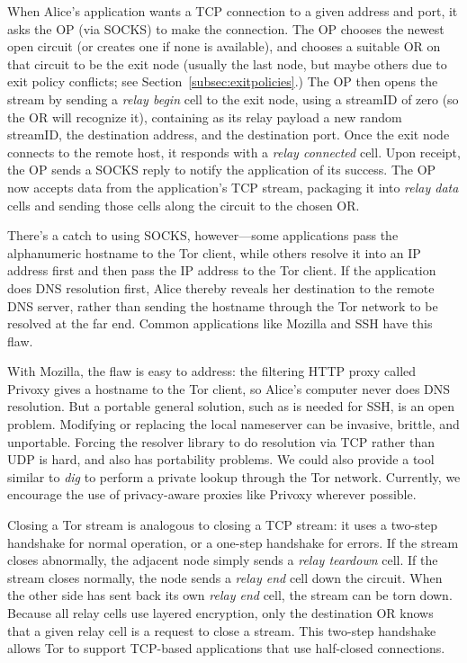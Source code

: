 \documentclass[times,10pt,twocolumn]{article}
\begin{document}
\label{subsec:tcp}

When Alice's application wants a TCP connection to a given
address and port, it asks the OP (via SOCKS) to make the
connection. The OP chooses the newest open circuit (or creates one if
none is available), and chooses a suitable OR on that circuit to be the
exit node (usually the last node, but maybe others due to exit policy
conflicts; see Section~\ref{subsec:exitpolicies}.) The OP then opens
the stream by sending a \emph{relay begin} cell to the exit node,
using a streamID of zero (so the OR will recognize it), containing as
its relay payload a new random streamID, the destination
address, and the destination port.  Once the
exit node connects to the remote host, it responds
with a \emph{relay connected} cell.  Upon receipt, the OP sends a
SOCKS reply to notify the application of its success. The OP
now accepts data from the application's TCP stream, packaging it into
\emph{relay data} cells and sending those cells along the circuit to
the chosen OR.

There's a catch to using SOCKS, however---some applications pass the
alphanumeric hostname to the Tor client, while others resolve it into
an IP address first and then pass the IP address to the Tor client. If
the application does DNS resolution first, Alice thereby reveals her
destination to the remote DNS server, rather than sending the hostname
through the Tor network to be resolved at the far end. Common applications
like Mozilla and SSH have this flaw.

With Mozilla, the flaw is easy to address: the filtering HTTP
proxy called Privoxy gives a hostname to the Tor client, so Alice's
computer never does DNS resolution.
But a portable general solution, such as is needed for
SSH, is
an open problem. Modifying or replacing the local nameserver
can be invasive, brittle, and unportable. Forcing the resolver
library to do resolution via TCP rather than UDP is
hard, and also has portability problems. We could also provide a
tool similar to \emph{dig} to perform a private lookup through the
Tor network. Currently, we encourage the use of
privacy-aware proxies like Privoxy wherever possible.

Closing a Tor stream is analogous to closing a TCP stream: it uses a
two-step handshake for normal operation, or a one-step handshake for
errors. If the stream closes abnormally, the adjacent node simply sends a
\emph{relay teardown} cell. If the stream closes normally, the node sends
a \emph{relay end} cell down the circuit. When the other side has sent
back its own \emph{relay end} cell, the stream can be torn down.  Because
all relay cells use layered encryption, only the destination OR knows
that a given relay cell is a request to close a stream.  This two-step
handshake allows Tor to support TCP-based applications that use half-closed
connections.
\end{document}

